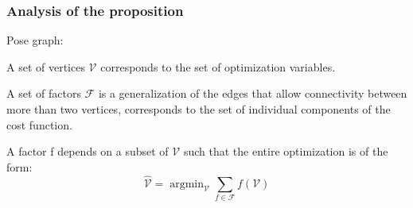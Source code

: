 \documentclass[12pt]{article}
\DeclareMathOperator*{\argmin}{argmin} %
\numberwithin{equation}{section}
\begin{document}
\subsubsection{Analysis of the proposition}
Pose graph:  \par
A set of vertices $\mathcal{V}$ corresponds to the set of optimization variables. \par
A set of factors $\mathcal{F}$ is a generalization of the edges that allow connectivity between more than two vertices, corresponds to the set of individual components of the cost function. \par
A factor f depends on a subset of $\mathcal{V}$ such that the entire optimization is of the form:
\begin{equation}
	\hat{\mathcal{V}}=\argmin_{\mathcal{V}} \sum_{f \in \mathcal{F}} f(\mathcal{V})
\end{equation}
\end{document}
